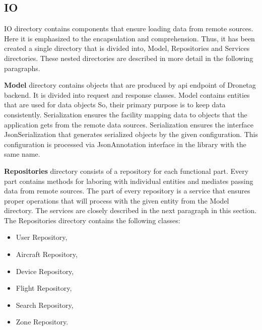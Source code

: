 \subsection{IO}\label{subsec:io}
IO directory contains components that ensure loading data from remote sources.
Here it is emphasized to the encapsulation and comprehension.
Thus, it has been created a single directory that is divided into, Model, Repositories and Services directories.
These nested directories are described in more detail in the following paragraphs.

\textbf{Model} directory contains objects that are produced by \acrshort{api} endpoint of Dronetag backend.
It is divided into request and response classes.
Model contains entities that are used for data objects
So, their primary purpose is to keep data consistently.
Serialization ensures the facility mapping data to objects that the application gets from the remote data sources.
Serialization ensures the interface JsonSerialization that generates serialized objects by the given configuration.
This configuration is processed via JsonAnnotation interface in the library with the same name.

\textbf{Repositories} directory consists of a repository for each functional part.
Every part contains methods for laboring with individual entities and mediates passing data from remote sources.
The part of every repository is a service that ensures proper operations that will process with the given entity from the Model directory.
The services are closely described in the next paragraph in this section.
The Repositories directory contains the following classes:
\begin{itemize}
    \item User Repository,
    \item Aircraft Repository,
    \item Device Repository,
    \item Flight Repository,
    \item Search Repository,
    \item Zone Repository.
\end{itemize}

